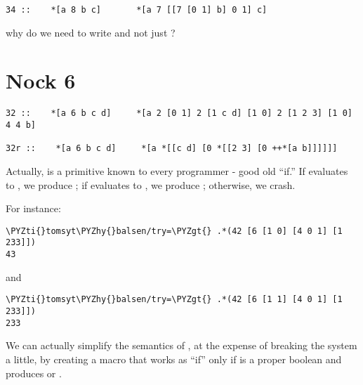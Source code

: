 \begin{framed_shaded}
\begin{Verbatim}[fontsize=\relsize{-2.5},commandchars=\\\{\}]
    34 ::    *[a 8 b c]       *[a 7 [[7 [0 1] b] 0 1] c]
\end{Verbatim}
\end{framed_shaded}
why do we need to write \kode{[7 [0 1] b]} and not just ?

\section{Nock 6}

\begin{framed_shaded}
\begin{Verbatim}[fontsize=\relsize{-2.5},commandchars=\\\{\}]
32 ::    *[a 6 b c d]     *[a 2 [0 1] 2 [1 c d] [1 0] 2 [1 2 3] [1 0] 4 4 b]

32r ::    *[a 6 b c d]     *[a *[[c d] [0 *[[2 3] [0 ++*[a b]]]]]]
\end{Verbatim}
\end{framed_shaded}

Actually,  is a primitive known to every programmer - good old
``if.''  If  evaluates to , we produce ; if  evaluates
to , we produce ; otherwise, we crash.

For instance:

\begin{framed_shaded}
\begin{Verbatim}[fontsize=\relsize{-2.5},commandchars=\\\{\}]
\PYZti{}tomsyt\PYZhy{}balsen/try=\PYZgt{} .*(42 [6 [1 0] [4 0 1] [1 233]])
43
\end{Verbatim}
\end{framed_shaded}
and

\begin{framed_shaded}
\begin{Verbatim}[fontsize=\relsize{-2.5},commandchars=\\\{\}]
\PYZti{}tomsyt\PYZhy{}balsen/try=\PYZgt{} .*(42 [6 [1 1] [4 0 1] [1 233]])
233
\end{Verbatim}
\end{framed_shaded}

We can actually simplify the semantics of , at the expense of
breaking the system a little, by creating a macro that works as
``if'' only if  is a proper boolean and produces  or .

